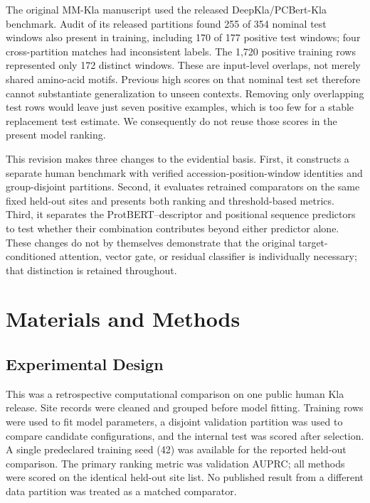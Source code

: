 \documentclass[twocolumn]{article}
\begin{document}
The original MM-Kla manuscript used the released DeepKla/PCBert-Kla benchmark.
Audit of its released partitions found 255 of 354 nominal test windows also
present in training, including 170 of 177 positive test windows; four
cross-partition matches had inconsistent labels. The 1,720 positive training
rows represented only 172 distinct windows. These are input-level overlaps,
not merely shared amino-acid motifs. Previous high scores on that nominal
test set therefore cannot substantiate generalization to unseen contexts.
Removing only overlapping test rows would leave just seven positive examples,
which is too few for a stable replacement test estimate. We consequently do
not reuse those scores in the present model ranking.

This revision makes three changes to the evidential basis. First, it constructs
a separate human benchmark with verified accession-position-window identities
and group-disjoint partitions. Second, it evaluates retrained comparators on
the same fixed held-out sites and presents both ranking and threshold-based
metrics. Third, it separates the ProtBERT--descriptor and positional sequence
predictors to test whether their combination contributes beyond either
predictor alone. These changes do not by themselves demonstrate that the
original target-conditioned attention, vector gate, or residual classifier is
individually necessary; that distinction is retained throughout.

\section{Materials and Methods}
\subsection{Experimental Design}
This was a retrospective computational comparison on one public human Kla
release. Site records were cleaned and grouped before model fitting.
Training rows were used to fit model parameters, a disjoint validation
partition was used to compare candidate configurations, and the internal
test was scored after selection. A single predeclared training seed (42)
was available for the reported held-out comparison. The primary ranking
metric was validation AUPRC; all methods were scored on the identical
held-out site list. No published result from a different data partition
was treated as a matched comparator.
\end{document}
